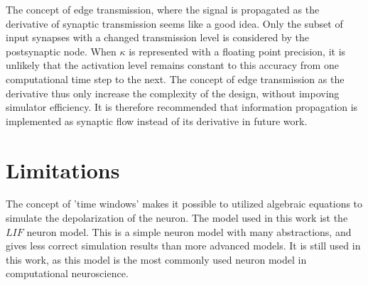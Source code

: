 The concept of edge transmission, where the signal is propagated as the derivative of synaptic transmission seems like a good idea.
Only the subset of input synapses with a changed transmission level is considered by the postsynaptic node.
When $\kappa$ is represented with a floating point precision, it is unlikely that the activation level remains constant 
	to this accuracy from one computational time step to the next.
The concept of edge transmission as the derivative thus only increase the complexity of the design, without impoving simulator efficiency.
It is therefore recommended that information propagation is implemented as synaptic flow instead of its derivative in future work.



\section{Limitations}

		The concept of 'time windows' makes it possible to utilized algebraic equations to simulate the depolarization of the neuron.
		The model used in this work ist the $LIF$ neuron model.
		This is a simple neuron model with many abstractions, and gives less correct simulation results than more advanced models\cite{CITE}.
		It is still used in this work, as this model is the most commonly used neuron model in computational neuroscience\cite{CITE}.

